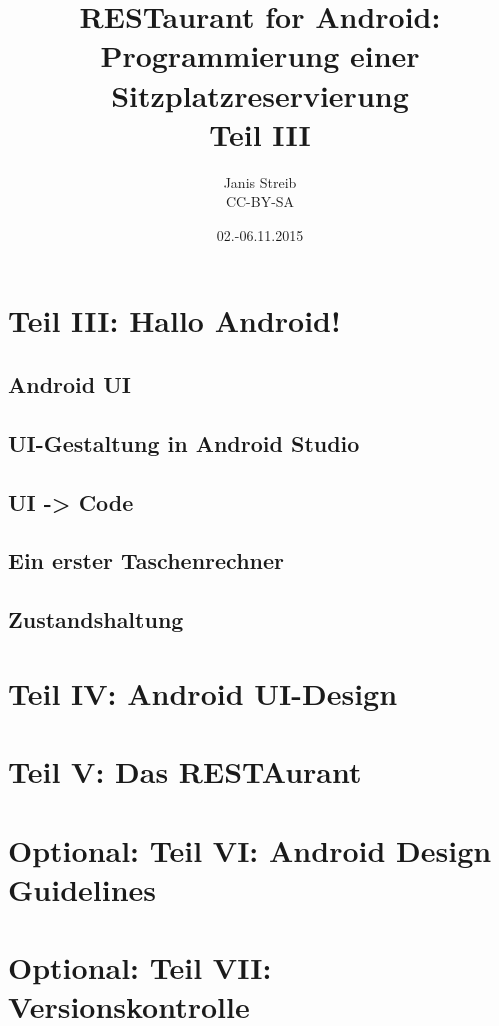 \documentclass{beamer}
\begin{document}
\title{RESTaurant for Android: Programmierung einer Sitzplatzreservierung \\ Teil III}   
\author{Janis Streib \\ CC-BY-SA} 
\date{02.-06.11.2015} 

\frame{\titlepage} 


%

\section{Teil III: Hallo Android!}
\subsection{Android UI}
\subsection{UI-Gestaltung in Android Studio}
\subsection{UI -> Code}
\subsection{Ein erster Taschenrechner}
\subsection{Zustandshaltung}
\section{Teil IV: Android UI-Design}
\section{Teil V: Das RESTAurant}
\section{Optional: Teil VI: Android Design Guidelines}
\section{Optional: Teil VII: Versionskontrolle}
\end{document}
